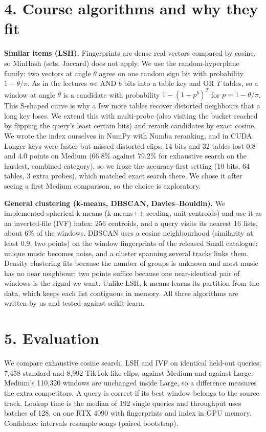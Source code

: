 \documentclass[11pt,a4paper]{article}
\begin{document}
\section*{4. Course algorithms and why they fit}
\textbf{Similar items (LSH).} Fingerprints are dense real vectors compared by cosine, so MinHash (sets, Jaccard) does not apply. We use the random-hyperplane family: two vectors at angle $\theta$ agree on one random sign bit with probability $1-\theta/\pi$. As in the lectures we AND $b$ bits into a table key and OR $T$ tables, so a window at angle $\theta$ is a candidate with probability $1-(1-p^b)^T$ for $p=1-\theta/\pi$. This S-shaped curve is why a few more tables recover distorted neighbours that a long key loses. We extend this with multi-probe (also visiting the bucket reached by flipping the query's least certain bits) and rerank candidates by exact cosine. We wrote the index ourselves in NumPy with Numba reranking, and in CUDA. Longer keys were faster but missed distorted clips: 14 bits and 32 tables lost 0.8 and 4.0 points on Medium (66.8\% against 79.2\% for exhaustive search on the hardest, combined category), so we froze the accuracy-first setting (10 bits, 64 tables, 3 extra probes), which matched exact search there. We chose it after seeing a first Medium comparison, so the choice is exploratory.

\textbf{General clustering (k-means, DBSCAN, Davies--Bouldin).} We implemented spherical k-means (k-means++ seeding, unit centroids) and use it as an inverted-file (IVF) index: 256 centroids, and a query visits its nearest 16 lists, about 6\% of the windows. DBSCAN uses a cosine neighbourhood (similarity at least 0.9, two points) on the window fingerprints of the released Small catalogue: unique music becomes noise, and a cluster spanning several tracks links them. Density clustering fits because the number of groups is unknown and most music has no near neighbour; two points suffice because one near-identical pair of windows is the signal we want. Unlike LSH, k-means learns its partition from the data, which keeps each list contiguous in memory. All three algorithms are written by us and tested against scikit-learn.

\section*{5. Evaluation}
We compare exhaustive cosine search, LSH and IVF on identical held-out queries: 7,458 standard and 8,992 TikTok-like clips, against Medium and against Large. Medium's 110,320 windows are unchanged inside Large, so a difference measures the extra competitors. A query is correct if its best window belongs to the source track. Lookup time is the median of 192 single queries and throughput uses batches of 128, on one RTX 4090 with fingerprints and index in GPU memory. Confidence intervals resample songs (paired bootstrap).
\end{document}
